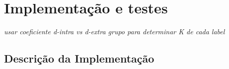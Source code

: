 \chapter{Implementação e testes}\label{cha:imp}

\textit{usar coeficiente d-intra vs d-extra grupo para determinar K de
cada label}















\section{Descrição da Implementação}

